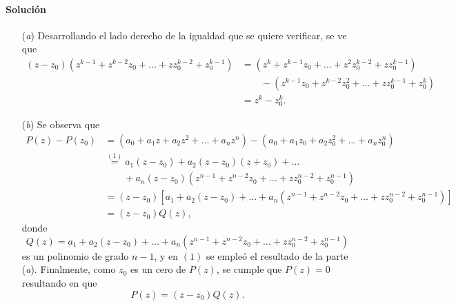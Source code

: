 \documentclass[a4paper]{report}
\begin{document}
\paragraph{Solución} 
\begin{enumerate}
 \item[(\textit{a})] Desarrollando el lado derecho de la igualdad que se quiere verificar, se ve que 
 \begin{align*}
  (z-z_0)(z^{k-1}+z^{k-2}z_0+\dots+zz_0^{k-2}+z_0^{k-1})&=(z^k+z^{k-1}z_0+\dots+z^2z_0^{k-2}+zz_0^{k-1})\\
   &\qquad-(z^{k-1}z_0+z^{k-2}z_0^2+\dots+zz_0^{k-1}+z_0^k)\\
   &=z^k-z_0^k.
 \end{align*}
 \item[(\textit{b})] Se observa que 
 \begin{align*}
  P(z)-P(z_0)&=(a_0+a_1z+a_2z^2+\dots+a_nz^n)-(a_0+a_1z_0+a_2z_0^2+\dots+a_nz_0^n)\\
   &\overset{(1)}{=}a_1(z-z_0)+a_2(z-z_0)(z+z_0)+\dots\\
   &\qquad+a_n(z-z_0)(z^{n-1}+z^{n-2}z_0+\dots+zz_0^{n-2}+z_0^{n-1})\\
   &=(z-z_0)\left[a_1+a_2(z-z_0)+\dots+a_n(z^{n-1}+z^{n-2}z_0+\dots+zz_0^{n-2}+z_0^{n-1})\right]\\
   &=(z-z_0)Q(z),
 \end{align*}
donde 
\[
 Q(z)=a_1+a_2(z-z_0)+\dots+a_n(z^{n-1}+z^{n-2}z_0+\dots+zz_0^{n-2}+z_0^{n-1})
\]
es un polinomio de grado \(n-1\), y en \((1)\) se empleó el resultado de la parte (\textit{a}). Finalmente, como \(z_0\) es un cero de \(P(z)\), se cumple que \(P(z)=0\) resultando en que 
\[
 P(z)=(z-z_0)Q(z).
\]
\end{enumerate}























\end{document}
